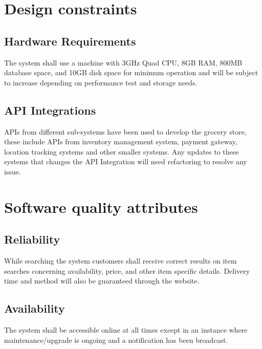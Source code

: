 \documentclass{scrreprt}
\theoremstyle{funreq}
\begin{document}
	\section{Design constraints}
	\subsection{Hardware Requirements}
	The system shall use a machine with  3GHz Quad CPU, 8GB RAM, 800MB database space, and 10GB disk space for minimum operation and will be subject to increase depending on performance test and storage needs.

	\subsection{API Integrations}
	APIs from different sub-systems have been used to develop the grocery store, these include APIs from  inventory management system, payment gateway, location tracking systems and other smaller systems. Any updates to these systems that changes the API Integration will need refactoring to resolve any issue.
	
	
	\section{Software quality attributes}
	\subsection{Reliability}
	While searching the system customers shall receive correct results on item searches concerning availability, price, and other item specific details. Delivery time and method will also be guaranteed through the website.
	
	\subsection{Availability}
	The system shall be accessible online at all times except in an instance where maintenance/upgrade is ongoing and a notification has been broadcast.
	
\end{document}
